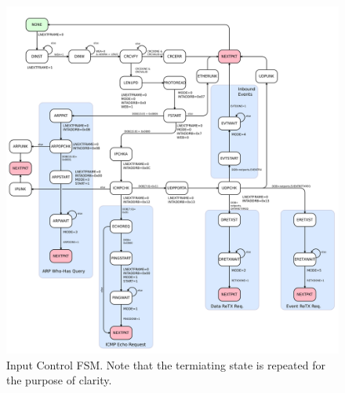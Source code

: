 \begin{figure}
\begin{centering}
\includegraphics[scale=0.7]{inputcontrol.fsm.svg}
\end{centering}
\caption{Input Control FSM. Note that the termiating  state is repeated for the purpose of clarity. }
\label{inputcontrol.fsm}
\end{figure}


